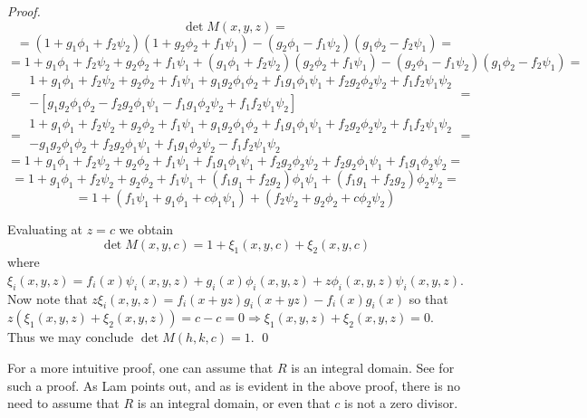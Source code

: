 \begin{proof}
  \[
    \det M(x,y,z)
    =
  \]
  \[
    =
    (1 + g_1 \phi_1 + f_2 \psi_2)(1 + g_2 \phi_2 + f_1 \psi_1) - (g_2 \phi_1 - f_1 \psi_2)(g_1 \phi_2 - f_2 \psi_1)
    =
  \]
  \[
    =
    1
    +
    g_1 \phi_1 + f_2 \psi_2 + g_2 \phi_2 + f_1 \psi_1
    + 
    (g_1 \phi_1 + f_2 \psi_2)(g_2 \phi_2 + f_1 \psi_1)
    -
    (g_2 \phi_1 - f_1 \psi_2)(g_1 \phi_2 - f_2 \psi_1)
    =
  \]
  \[
    =
    \begin{matrix}
    1
    +
    g_1 \phi_1 + f_2 \psi_2 + g_2 \phi_2 + f_1 \psi_1
    + 
    g_1 g_2 \phi_1 \phi_2 + f_1 g_1 \phi_1 \psi_1
    +
    f_2 g_2 \phi_2 \psi_2 + f_1 f_2 \psi_1 \psi_2
    \\
    -
    \left[
      g_1 g_2 \phi_1 \phi_2 - f_2 g_2 \phi_1 \psi_1 - f_1 g_1 \phi_2 \psi_2 + f_1 f_2 \psi_1 \psi_2
    \right]
    \end{matrix}
    =
  \]
  \[
    =
    \begin{matrix}
    1
    +
    g_1 \phi_1 + f_2 \psi_2 + g_2 \phi_2 + f_1 \psi_1
    + 
    g_1 g_2 \phi_1 \phi_2 + f_1 g_1 \phi_1 \psi_1
    +
    f_2 g_2 \phi_2 \psi_2 + f_1 f_2 \psi_1 \psi_2
    \\
    -g_1 g_2 \phi_1 \phi_2 + f_2 g_2 \phi_1 \psi_1 + f_1 g_1 \phi_2 \psi_2 - f_1 f_2 \psi_1 \psi_2
    \end{matrix}
    =
  \]
  \[
    =
    1
    +
    g_1 \phi_1 + f_2 \psi_2 + g_2 \phi_2 + f_1 \psi_1
    + 
    f_1 g_1 \phi_1 \psi_1
    +
    f_2 g_2 \phi_2 \psi_2
    +
    f_2 g_2 \phi_1 \psi_1 + f_1 g_1 \phi_2 \psi_2
    =
  \]
  \[
    =
    1
    +
    g_1 \phi_1 + f_2 \psi_2 + g_2 \phi_2 + f_1 \psi_1
    + 
    (f_1 g_1 + f_2 g_2) \phi_1 \psi_1
    +
    (f_1 g_1 + f_2 g_2) \phi_2 \psi_2
    =
  \]
  \[
    =
    1
    +
    (f_1 \psi_1 + g_1 \phi_1 + c \phi_1 \psi_1)
    +
    (f_2 \psi_2 + g_2 \phi_2 + c \phi_2 \psi_2)
  \]

  Evaluating at $z = c$ we obtain
  \[
    \det M(x,y,c)
    =
    1 + \xi_1(x,y,c) + \xi_2(x,y,c)
  \]
  where
  $\xi_i(x,y,z) = f_i(x) \psi_i(x,y,z) + g_i(x) \phi_i(x,y,z) + z \phi_i(x,y,z) \psi_i(x,y,z)$.
  Now note that $z \xi_i(x,y,z) = f_i(x+yz) g_i(x+yz) - f_i(x) g_i(x)$ so
  that $z (\xi_1(x,y,z) + \xi_2(x,y,z)) = c - c = 0 \Rightarrow \xi_1(x,y,z) + \xi_2(x,y,z) = 0$.
  Thus we may conclude $\det M(h,k,c) = 1$.
  \qed
\end{proof}
\begin{remark}
  For a more intuitive proof, one can assume that $R$ is an integral domain.
  See \citep[Lemma 1.2, p. ~100]{lam06} for such a proof.
  As Lam points out, and as is evident in the above proof, there is no need to assume that
  $R$ is an integral domain, or even that $c$ is not a zero divisor.
\end{remark}

